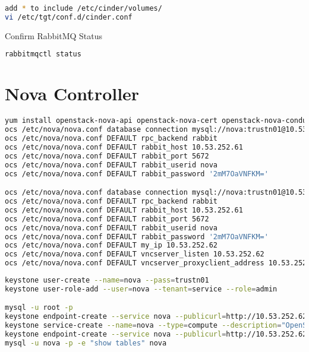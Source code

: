 \documentclass[11pt,letterpaper,oneside]{book}
\begin{document}
\begin{lstlisting}[caption={add * to include /etc/cinder/volumes/},language=bash]
add * to include /etc/cinder/volumes/
vi /etc/tgt/conf.d/cinder.conf
\end{lstlisting}


\begin{flushleft}
\begin{huge} \danger \end{huge} Confirm RabbitMQ Status
\end{flushleft}
\begin{lstlisting}[caption={},language=bash]
rabbitmqctl status
\end{lstlisting}

\chapter{Nova Controller}

\begin{lstlisting}[caption={},language=bash]
yum install openstack-nova-api openstack-nova-cert openstack-nova-conductor openstack-nova-console openstack-nova-novncproxy openstack-nova-scheduler python-novaclient
ocs /etc/nova/nova.conf database connection mysql://nova:trustn01@10.53.252.61/nova
ocs /etc/nova/nova.conf DEFAULT rpc_backend rabbit
ocs /etc/nova/nova.conf DEFAULT rabbit_host 10.53.252.61
ocs /etc/nova/nova.conf DEFAULT rabbit_port 5672
ocs /etc/nova/nova.conf DEFAULT rabbit_userid nova
ocs /etc/nova/nova.conf DEFAULT rabbit_password '2mM7OaVNFKM='

ocs /etc/nova/nova.conf database connection mysql://nova:trustn01@10.53.252.61/nova
ocs /etc/nova/nova.conf DEFAULT rpc_backend rabbit
ocs /etc/nova/nova.conf DEFAULT rabbit_host 10.53.252.61
ocs /etc/nova/nova.conf DEFAULT rabbit_port 5672
ocs /etc/nova/nova.conf DEFAULT rabbit_userid nova
ocs /etc/nova/nova.conf DEFAULT rabbit_password '2mM7OaVNFKM='
ocs /etc/nova/nova.conf DEFAULT my_ip 10.53.252.62
ocs /etc/nova/nova.conf DEFAULT vncserver_listen 10.53.252.62
ocs /etc/nova/nova.conf DEFAULT vncserver_proxyclient_address 10.53.252.62
\end{lstlisting}

\begin{lstlisting}[caption={virctlpaw001},language=bash]
keystone user-create --name=nova --pass=trustn01 
keystone user-role-add --user=nova --tenant=service --role=admin

mysql -u root -p
keystone endpoint-create --service nova --publicurl=http://10.53.252.62:8774/v2/%\(tenant_id\)s --internalurl=http://10.53.252.62:8774/v2/%\(tenant_id\)s --adminurl=http://10.53.252.62:8774/v2/%\(tenant_id\)s
keystone service-create --name=nova --type=compute --description="OpenStack Compute"
keystone endpoint-create --service nova --publicurl=http://10.53.252.62:8774/v2/%\(tenant_id\)s --internalurl=http://10.53.252.62:8774/v2/%\(tenant_id\)s --adminurl=http://10.53.252.62:8774/v2/%\(tenant_id\)s
mysql -u nova -p -e "show tables" nova

\end{lstlisting}
\end{document}
